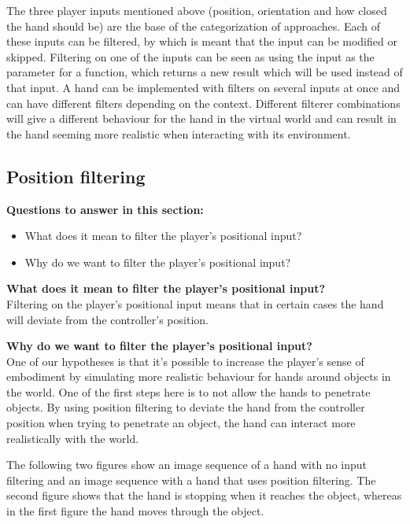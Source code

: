 The three player inputs mentioned above (position, orientation and how closed the hand should be) are the base of the categorization of approaches. Each of these inputs can be filtered, by which is meant that the input can be modified or skipped. Filtering on one of the inputs can be seen as using the input as the parameter for a function, which returns a new result which will be used instead of that input. A hand can be implemented with filters on several inputs at once and can have different filters depending on the context. Different filterer combinations will give a different behaviour for the hand in the virtual world and can result in the hand seeming more realistic when interacting with its environment.


\subsection{Position filtering}
\label{subsec:categoryPositionFiltering}
\textbf{Questions to answer in this section:}
\begin{itemize}
\item What does it mean to filter the player's positional input?
\item Why do we want to filter the player's positional input?
\end{itemize}

\textbf{What does it mean to filter the player's positional input?}\\
Filtering on the player's positional input means that in certain cases the hand will deviate from the controller's position.

\textbf{Why do we want to filter the player's positional input?}\\
One of our hypotheses is that it's possible to increase the player's sense of embodiment by simulating more realistic behaviour for hands around objects in the world. One of the first steps here is to not allow the hands to penetrate objects. By using position filtering to deviate the hand from the controller position when trying to penetrate an object, the hand can interact more realistically with the world.

The following two figures show an image sequence of a hand with no input filtering and an image sequence with a hand that uses position filtering. The second figure shows that the hand is stopping when it reaches the object, whereas in the first figure the hand moves through the object.

